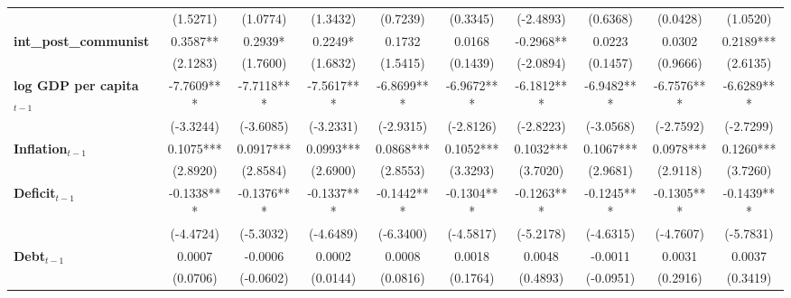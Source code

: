 \begin{center}
\begin{tabular}{lccccccccc}
\textbf{ }                         &    (1.5271)    &     (1.0774)     &     (1.3432)     &     (0.7239)     &     (0.3345)     &    (-2.4893)     &     (0.6368)     &     (0.0428)     &     (1.0520)      \\
\textbf{int\_post\_communist}      &    0.3587**    &     0.2939*      &     0.2249*      &      0.1732      &      0.0168      &    -0.2968**     &      0.0223      &      0.0302      &    0.2189***      \\
\textbf{ }                         &    (2.1283)    &     (1.7600)     &     (1.6832)     &     (1.5415)     &     (0.1439)     &    (-2.0894)     &     (0.1457)     &     (0.9666)     &     (2.6135)      \\
\textbf{log GDP per capita$_{t-1}$}           &   -7.7609***   &    -7.7118***    &    -7.5617***    &    -6.8699***    &    -6.9672***    &    -6.1812***    &    -6.9482***    &    -6.7576***    &    -6.6289***     \\
\textbf{ }                         &   (-3.3244)    &    (-3.6085)     &    (-3.2331)     &    (-2.9315)     &    (-2.8126)     &    (-2.8223)     &    (-3.0568)     &    (-2.7592)     &    (-2.7299)      \\
\textbf{Inflation$_{t-1}$}      &   0.1075***    &    0.0917***     &    0.0993***     &    0.0868***     &    0.1052***     &    0.1032***     &    0.1067***     &    0.0978***     &    0.1260***      \\
\textbf{ }                         &    (2.8920)    &     (2.8584)     &     (2.6900)     &     (2.8553)     &     (3.3293)     &     (3.7020)     &     (2.9681)     &     (2.9118)     &     (3.7260)      \\
\textbf{Deficit$_{t-1}$}             &   -0.1338***   &    -0.1376***    &    -0.1337***    &    -0.1442***    &    -0.1304***    &    -0.1263***    &    -0.1245***    &    -0.1305***    &    -0.1439***     \\
\textbf{ }                         &   (-4.4724)    &    (-5.3032)     &    (-4.6489)     &    (-6.3400)     &    (-4.5817)     &    (-5.2178)     &    (-4.6315)     &    (-4.7607)     &    (-5.7831)      \\
\textbf{Debt$_{t-1}$}                &     0.0007     &     -0.0006      &      0.0002      &      0.0008      &      0.0018      &      0.0048      &     -0.0011      &      0.0031      &      0.0037       \\
\textbf{ }                         &    (0.0706)    &    (-0.0602)     &     (0.0144)     &     (0.0816)     &     (0.1764)     &     (0.4893)     &    (-0.0951)     &     (0.2916)     &     (0.3419)      \\

\end{tabular}
\end{center}
